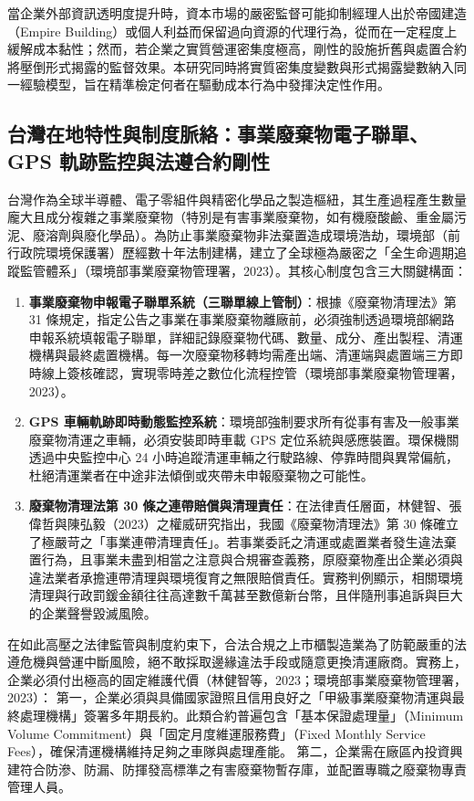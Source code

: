 \documentclass[12pt,a4paper]{article}
\begin{document}
當企業外部資訊透明度提升時，資本市場的嚴密監督可能抑制經理人出於帝國建造（Empire Building）或個人利益而保留過向資源的代理行為，從而在一定程度上緩解成本黏性；然而，若企業之實質營運密集度極高，剛性的設施折舊與處置合約將壓倒形式揭露的監督效果。本研究同時將實質密集度變數與形式揭露變數納入同一經驗模型，旨在精準檢定何者在驅動成本行為中發揮決定性作用。

\subsection{台灣在地特性與制度脈絡：事業廢棄物電子聯單、GPS 軌跡監控與法遵合約剛性}

台灣作為全球半導體、電子零組件與精密化學品之製造樞紐，其生產過程產生數量龐大且成分複雜之事業廢棄物（特別是有害事業廢棄物，如有機廢酸鹼、重金屬污泥、廢溶劑與廢化學品）。為防止事業廢棄物非法棄置造成環境浩劫，環境部（前行政院環境保護署）歷經數十年法制建構，建立了全球極為嚴密之「全生命週期追蹤監管體系」（環境部事業廢棄物管理署，2023）。其核心制度包含三大關鍵構面：

\begin{enumerate}[leftmargin=*]
    \item \textbf{事業廢棄物申報電子聯單系統（三聯單線上管制）}：根據《廢棄物清理法》第 31 條規定，指定公告之事業在事業廢棄物離廠前，必須強制透過環境部網路申報系統填報電子聯單，詳細記錄廢棄物代碼、數量、成分、產出製程、清運機構與最終處置機構。每一次廢棄物移轉均需產出端、清運端與處置端三方即時線上簽核確認，實現零時差之數位化流程控管（環境部事業廢棄物管理署，2023）。
    \item \textbf{GPS 車輛軌跡即時動態監控系統}：環境部強制要求所有從事有害及一般事業廢棄物清運之車輛，必須安裝即時車載 GPS 定位系統與感應裝置。環保機關透過中央監控中心 24 小時追蹤清運車輛之行駛路線、停靠時間與異常偏航，杜絕清運業者在中途非法傾倒或夾帶未申報廢棄物之可能性。
    \item \textbf{廢棄物清理法第 30 條之連帶賠償與清理責任}：在法律責任層面，林健智、張偉哲與陳弘毅（2023）之權威研究指出，我國《廢棄物清理法》第 30 條確立了極嚴苛之「事業連帶清理責任」。若事業委託之清運或處置業者發生違法棄置行為，且事業未盡到相當之注意與合規審查義務，原廢棄物產出企業必須與違法業者承擔連帶清理與環境復育之無限賠償責任。實務判例顯示，相關環境清理與行政罰鍰金額往往高達數千萬甚至數億新台幣，且伴隨刑事追訴與巨大的企業聲譽毀滅風險。
\end{enumerate}

在如此高壓之法律監管與制度約束下，合法合規之上市櫃製造業為了防範嚴重的法遵危機與營運中斷風險，絕不敢採取邊緣違法手段或隨意更換清運廠商。實務上，企業必須付出極高的固定維護代價（林健智等，2023；環境部事業廢棄物管理署，2023）：
第一，企業必須與具備國家證照且信用良好之「甲級事業廢棄物清運與最終處理機構」簽署多年期長約。此類合約普遍包含「基本保證處理量」（Minimum Volume Commitment）與「固定月度維運服務費」（Fixed Monthly Service Fees），確保清運機構維持足夠之車隊與處理產能。
第二，企業需在廠區內投資興建符合防滲、防漏、防揮發高標準之有害廢棄物暫存庫，並配置專職之廢棄物專責管理人員。
\end{document}

